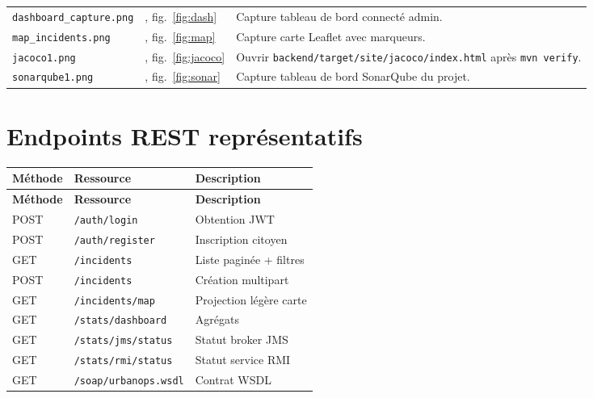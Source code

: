 \documentclass[12pt,a4paper,twoside,openany]{book}
\begin{document}
{\begin{longtable}{@{}p{3.05cm} p{3.35cm} >{\RaggedRight\arraybackslash}p{8.65cm}@{}}
  \texttt{dashboard\_capture.png} & \nameref{chap:front}, fig.~\ref{fig:dash} & Capture tableau de bord connecté admin. \\
  \texttt{map\_incidents.png} & \nameref{chap:front}, fig.~\ref{fig:map} & Capture carte Leaflet avec marqueurs. \\
  \texttt{jacoco1.png} & \nameref{chap:tests}, fig.~\ref{fig:jacoco} & Ouvrir \texttt{backend/target/site/jacoco/index.html} après \texttt{mvn verify}. \\
  \texttt{sonarqube1.png} & \nameref{chap:tests}, fig.~\ref{fig:sonar} & Capture tableau de bord SonarQube du projet. \\
  \bottomrule
\end{longtable}
}

\chapter{Endpoints REST repr\'esentatifs}
\label{ann:endpoints}
\begin{longtable}{@{}l l >{\RaggedRight\arraybackslash}p{7.6cm}@{}}
  \toprule
  \textbf{Méthode} & \textbf{Ressource} & \textbf{Description} \\
  \midrule
  \endfirsthead
  \toprule
  \textbf{Méthode} & \textbf{Ressource} & \textbf{Description} \\
  \midrule
  \endhead
  POST & \texttt{/auth/login} & Obtention JWT \\
  POST & \texttt{/auth/register} & Inscription citoyen \\
  GET & \texttt{/incidents} & Liste paginée + filtres \\
  POST & \texttt{/incidents} & Création multipart \\
  GET & \texttt{/incidents/map} & Projection légère carte \\
  GET & \texttt{/stats/dashboard} & Agrégats \\
  GET & \texttt{/stats/jms/status} & Statut broker JMS \\
  GET & \texttt{/stats/rmi/status} & Statut service RMI \\
  GET & \texttt{/soap/urbanops.wsdl} & Contrat WSDL \\
  \bottomrule
\end{longtable}
\end{document}
